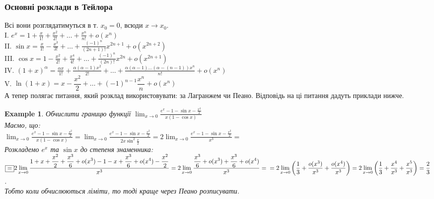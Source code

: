 \documentclass[a4paper, 14pt]{article}
\theoremstyle{theoremdd}
\theoremstyle{theoremdd}
\theoremstyle{theoremdd}
\theoremstyle{theoremdd}
\newtheorem{example}[theorem]{Example}
\theoremstyle{theoremdd}
\theoremstyle{theoremdd}
\theoremstyle{theoremdd}
\theoremstyle{theoremdd}
\begin{document}
\subsubsection*{Основні розклади в Тейлора}
Всі вони розглядатимуться в т. $x_0 = 0$, всюди $x \to x_0$.\\
I. $e^x \displaystyle = 1 + \frac{x}{1!} + \frac{x^2}{2!} + \dots + \frac{x^n}{n!} + o(x^n)$\\
II. $\sin x \displaystyle = \frac{x}{1!} - \frac{x^3}{3!} + \dots + \frac{(-1)^n}{(2n+1)!}x^{2n+1} + o(x^{2n+2})$\\
III. $\cos x \displaystyle = 1 - \frac{x^2}{2!} + \frac{x^4}{4!} + \dots + \frac{(-1)^n}{(2n)!}x^{2n} + o(x^{2n+1})$\\
IV. $(1+x)^{\alpha} \displaystyle = \frac{\alpha x}{1!} + \frac{\alpha (\alpha-1) x^2}{2!} + \dots + \frac{\alpha (\alpha-1)\dots(\alpha-(n-1)) x^n}{n!} + o(x^n)$\\
V. $\ln(1+x) = x - \dfrac{x^2}{2} + \dots + (-1)^{n-1} \dfrac{x^n}{n} + o(x^n)$
\bigskip \\
А тепер полягає питання, який розклад використовувати: за Лагранжем чи Пеано. Відповідь на ці питання дадуть приклади нижче.
\begin{example}
Обчислити границю функції $\displaystyle \lim_{x \to 0} \frac{\displaystyle e^x-1-\sin x - \frac{x^2}{2}}{x(1-\cos x)}$\\
Маємо, що:\\
$\displaystyle \lim_{x \to 0} \frac{\displaystyle e^x-1-\sin x - \frac{x^2}{2}}{x(1-\cos x)} = \lim_{x \to 0} \frac{\displaystyle e^x - 1 - \sin x - \frac{x^2}{2}}{2x \sin^2 \frac{x}{2}} = 2\lim_{x \to 0} \frac{\displaystyle e^x - 1 - \sin x - \frac{x^2}{2}}{x^3} \boxed{=} $\\
Розкладемо $e^x$ та $\sin x$ до степеня знаменника:\\
$\boxed{=} \displaystyle 2\lim_{x \to 0} \frac{\displaystyle 1 + x + \frac{x^2}{2} + \frac{x^3}{6} + o(x^3) - 1 - x + \frac{x^3}{6} + o(x^4) - \frac{x^2}{2}}{x^3} = 2\lim_{x \to 0} \frac{\displaystyle \frac{x^3}{6} + o(x^3) + \frac{x^3}{6} + o(x^4)}{x^3} = \\ = 2 \lim_{x \to 0} \left(\frac{1}{3} + \frac{o(x^3)}{x^3} + \frac{o(x^4)}{x^3} \right) = 2 \lim_{x \to 0} \left(\frac{1}{3} + \frac{x^4}{x^3} + \frac{x^5}{x^3} \right) = \frac{2}{3}$.\\
\textit{Тобто коли обчислюються ліміти, то тоді краще через Пеано розписувати.}
\end{example}
\end{document}
